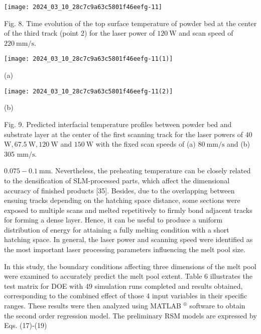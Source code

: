 \documentclass[10pt]{article}
\begin{document}
\begin{center}
\texttt{[image: 2024\_03\_10\_28c7c9a63c5801f46eefg-11]}
\end{center}

Fig. 8. Time evolution of the top surface temperature of powder bed at the center of the third track (point 2) for the laser power of $120 \mathrm{~W}$ and scan speed of $220 \mathrm{~mm} / \mathrm{s}$.

\begin{center}
\texttt{[image: 2024\_03\_10\_28c7c9a63c5801f46eefg-11(1)]}
\end{center}

(a)

\begin{center}
\texttt{[image: 2024\_03\_10\_28c7c9a63c5801f46eefg-11(2)]}
\end{center}

(b)

Fig. 9. Predicted interfacial temperature profiles between powder bed and substrate layer at the center of the first scanning track for the laser powers of 40 $\mathrm{W}, 67.5 \mathrm{~W}, 120 \mathrm{~W}$ and $150 \mathrm{~W}$ with the fixed scan speeds of (a) $80 \mathrm{~mm} / \mathrm{s}$ and (b) 305 $\mathrm{mm} / \mathrm{s}$.

$0.075-0.1 \mathrm{~mm}$. Nevertheless, the preheating temperature can be closely related to the densification of SLM-processed parts, which affect the dimensional accuracy of finished products [35]. Besides, due to the overlapping between ensuing tracks depending on the hatching space distance, some sections were exposed to multiple scans and melted repetitively to firmly bond adjacent tracks for forming a dense layer. Hence, it can be useful to produce a uniform distribution of energy for attaining a fully melting condition with a short hatching space. In general, the laser power and scanning speed were identified as the most important laser processing parameters influencing the melt pool size.

In this study, the boundary conditions affecting three dimensions of the melt pool were examined to accurately predict the melt pool extent. Table 6 illustrates the test matrix for DOE with 49 simulation runs completed and results obtained, corresponding to the combined effect of those 4 input variables in their specific ranges. These results were then analyzed using MATLAB ${ }^{\circledR}$ software to obtain the second order regression model. The preliminary RSM models are expressed by Eqs. (17)-(19)
\end{document}
